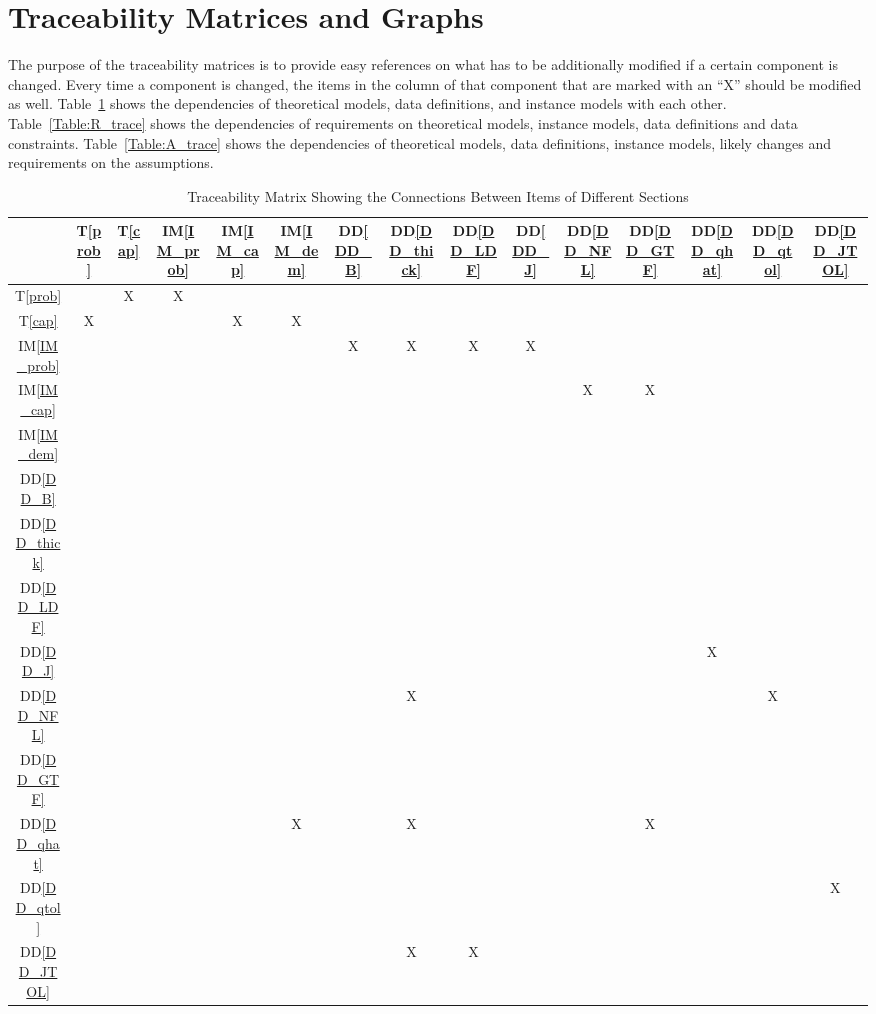 \documentclass[12pt]{article}
\newcommand{\ddref}[1]{DD\ref{#1}}
\newcommand{\tref}[1]{T\ref{#1}}
\newcommand{\iref}[1]{IM\ref{#1}}
\begin{document}
\section{Traceability Matrices and Graphs}
The purpose of the traceability matrices is to provide easy references on what 
has to be additionally modified if a certain component is changed.  Every time a 
component is changed, the items in the column of that component that are 
marked with an ``X'' should be modified as well.  Table~\ref{Table:trace}
shows the dependencies of theoretical models, data definitions, and instance 
models with each other. Table~\ref{Table:R_trace} shows the dependencies of 
requirements on theoretical models, instance models, data definitions and 
data constraints. Table~\ref{Table:A_trace} shows the dependencies 
of theoretical models, data definitions, instance models, likely changes and 
requirements on the assumptions.
\newline

\begin{table}[h!]
\centering
\begin{tabular}{|c|c|c|c|c|c|c|c|c|c|c|c|c|c|c|}
\hline        
	& \tref{prob} & \tref{cap} & \iref{IM_prob} & \iref{IM_cap}& \iref{IM_dem} & 
	\ddref{DD_B} & \ddref{DD_thick} & \ddref{DD_LDF} & \ddref{DD_J} & \ddref{DD_NFL} & 
	\ddref{DD_GTF} & \ddref{DD_qhat} & \ddref{DD_qtol} & \ddref{DD_JTOL} \\
\hline
\tref{prob}           & & X & X & & & & & & & & & & & \\ \hline
\tref{cap}             & X & & & X & X & & & & & & & & & \\ \hline
\iref{IM_prob}      & & & & & & X & X & X & X & & & & & \\ \hline
\iref{IM_cap}        & & & & & & & & & & X & X & & & \\ \hline
\iref{IM_dem}       & & & & & & & & & & & & & & \\ \hline
\ddref{DD_B}       & & & & & & & & & & & & & & \\ \hline
\ddref{DD_thick}  & & & & & & & & & & & & & & \\ \hline
\ddref{DD_LDF}   & & & & & & & & & & & & & & \\ \hline
\ddref{DD_J}        & & & & & & & & & & & & X & & \\ \hline
\ddref{DD_NFL}   & & & & & & & X & & & & & & X & \\ \hline
\ddref{DD_GTF}   & & & & & & & & & & & & & & \\ \hline
\ddref{DD_qhat}   & & & & & X & & X & & & & X & & & \\ \hline
\ddref{DD_qtol}    & & & & & & & & & & & & & & X \\ \hline
\ddref{DD_JTOL} & & & & & & & X & X & & & & & & \\
\hline
\end{tabular}
\caption{Traceability Matrix Showing the Connections Between Items of Different Sections}
\label{Table:trace}
\end{table}
\end{document}
